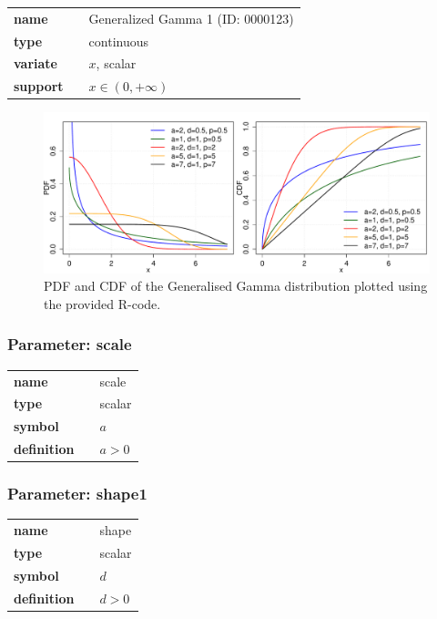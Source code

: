   \bigskip 

\begin{tabular}{p{2cm}cl}
\textbf{name} & & Generalized Gamma 1 (ID: 0000123)\\ 
 
\textbf{type} & & continuous \\ 

\textbf{variate} & & $x$, scalar \\ 

\textbf{support} & & $x \in (0,+\infty)$
\end{tabular}

\begin{figure}[ht!]
\centering
  \includegraphics[width=140mm]{pics/GeneralisedGamma_pdf_cdf.pdf}
 \caption{PDF and CDF of the Generalised Gamma distribution plotted using the provided R-code.}
 \label{fig:GeneralisedGamma_pdf_cdf}
\end{figure}

\subsubsection*{Parameter: scale}

\noindent\begin{tabular}{p{2cm}cl}
\textbf{name} & & scale \\
\textbf{type} & & scalar \\
\textbf{symbol} & & $a$  \\
\textbf{definition} & & $a > 0$
\end{tabular}
\subsubsection*{Parameter: shape1}

\noindent\begin{tabular}{p{2cm}cl}
\textbf{name} & & shape \\
\textbf{type} & & scalar \\
\textbf{symbol} & & $d$  \\
\textbf{definition} & & $d > 0$
\end{tabular}
